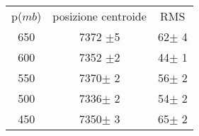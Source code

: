 
\begin{center}
\begin{tabulary}{\textwidth}{CCC}
\toprule
p($mb$) & posizione centroide & RMS \\ 
650 &7372 $\pm$5 &62$\pm$ 4\\
600 &7352 $\pm$2 &44$\pm$ 1\\
550 &7370$\pm$ 2 &56$\pm$ 2\\
500 &7336$\pm$ 2 &54$\pm$ 2\\
450 &7350$\pm$ 3 &65$\pm$ 2\\
\bottomrule
\end{tabulary}
\end{center}
